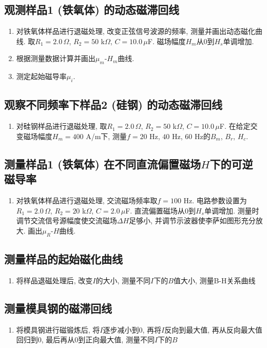 \documentclass[zihao=5, UTF8]{article}
\theoremstyle{MyLineTheoremStyle} %
\theoremstyle{MyBlockTheoremStyle} %
\theoremstyle{MySubsubsectionStyle} %
\begin{document}
\subsection{观测样品1 (铁氧体) 的动态磁滞回线}
\begin{enumerate}
    \item 对铁氧体样品进行退磁处理, 改变正弦信号波源的频率, 测量并画出动态磁化曲线. 取$R_1=2.0\,\Omega$, $R_2=50$ k$\Omega$, $C=10.0\,\mu$F. 磁场幅度$H_m$从$0$到$H_s$单调增加. 
    \item 根据测量数据计算并画出$\mu_m$-$H_m$曲线. 
    \item 测定起始磁导率$\mu_i$. 
\end{enumerate}

\subsection{观察不同频率下样品2 (硅钢) 的动态磁滞回线}
\begin{enumerate}
    \item 对硅钢样品进行退磁处理, 取$R_1=2.0\,\Omega$, $R_2=50$ k$\Omega$, $C=10.0\,\mu$F. 在给定交变磁场幅度$H_m=400$ A/m下, 测量$f=20$ Hz, $40$ Hz, $60$ Hz的$B_m$, $B_r$, $H_c$. 
\end{enumerate}

\subsection{测量样品1 (铁氧体) 在不同直流偏置磁场$H$下的可逆磁导率}
\begin{enumerate}
    \item 对铁氧体样品进行退磁处理, 交流磁场频率取$f=100$ Hz. 电路参数设置为$R_1=2.0\,\Omega$, $R_2=20$ k$\Omega$, $C=2.0\,\mu$F. 直流偏置磁场从$0$到$H_s$单调增加. 测量时调节交流信号源幅度使交流磁场$\Delta H$足够小, 并调节示波器使李萨如图形充分放大. 画出$\mu_R$-$H$曲线. 
\end{enumerate}
\subsection{测量样品的起始磁化曲线}
\begin{enumerate}
    \item 将样品退磁处理后, 改变$I$的大小, 测量不同$I$下的$B$值大小, 测量B-H关系曲线
\end{enumerate}

\subsection{测量模具钢的磁滞回线}
\begin{enumerate}
    \item 将模具钢进行磁锻炼后, 将$I$逐步减小到$0$, 再将$I$反向到最大值, 再从反向最大值回归到$0$, 最后再从$0$到正向最大值, 测量不同$I$下的$B$
\end{enumerate}
\end{document}
